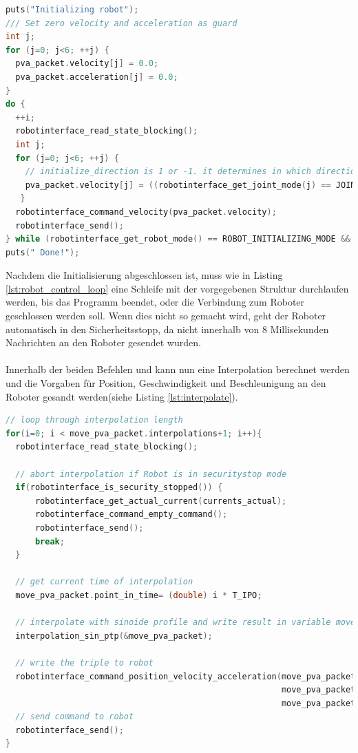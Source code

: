 \begin{lstlisting}[language=C,caption={Initialisierung der einzelnen Gelenke}, label=lst:initialize_robot_lst,captionpos=b]
puts("Initializing robot");
/// Set zero velocity and acceleration as guard
int j;
for (j=0; j<6; ++j) {
  pva_packet.velocity[j] = 0.0;
  pva_packet.acceleration[j] = 0.0;
}
do {
  ++i;
  robotinterface_read_state_blocking();
  int j;
  for (j=0; j<6; ++j) {
    // initialize_direction is 1 or -1. it determines in which direction die Joint is moving during the initialization
    pva_packet.velocity[j] = ((robotinterface_get_joint_mode(j) == JOINT_INITIALISATION_MODE)) ? (initialize_direction)* 0.1 : 0.0;
   }
  robotinterface_command_velocity(pva_packet.velocity);
  robotinterface_send();
} while (robotinterface_get_robot_mode() == ROBOT_INITIALIZING_MODE && exit_flag == false);
puts(" Done!");
\end{lstlisting}

Nachdem die Initialisierung abgeschlossen ist, muss wie in Listing \ref{lst:robot_control_loop} eine Schleife mit der vorgegebenen Struktur durchlaufen werden, bis das Programm beendet, oder die Verbindung zum Roboter geschlossen werden soll. Wenn dies nicht so gemacht wird, geht der Roboter automatisch in den Sicherheitsstopp, da nicht innerhalb von 8 Millisekunden Nachrichten an den Roboter gesendet wurden.
\\\\
Innerhalb der beiden Befehlen  und  kann nun eine Interpolation berechnet werden und die Vorgaben für Position, Geschwindigkeit und Beschleunigung an den Roboter gesandt werden(siehe Listing \ref{lst:interpolate}).

\begin{lstlisting}[language=C,caption={Interpolation eines Berechneten Weges}, label=lst:interpolate,captionpos=b]
// loop through interpolation length  
for(i=0; i < move_pva_packet.interpolations+1; i++){
  robotinterface_read_state_blocking();

  // abort interpolation if Robot is in securitystop mode
  if(robotinterface_is_security_stopped()) {
      robotinterface_get_actual_current(currents_actual);
      robotinterface_command_empty_command();
      robotinterface_send();
      break;
  }

  // get current time of interpolation 
  move_pva_packet.point_in_time= (double) i * T_IPO;

  // interpolate with sinoide profile and write result in variable move_pva_packet
  interpolation_sin_ptp(&move_pva_packet);

  // write the triple to robot
  robotinterface_command_position_velocity_acceleration(move_pva_packet.pva.position,
                                                        move_pva_packet.pva.velocity,
                                                        move_pva_packet.pva.acceleration);
  // send command to robot
  robotinterface_send();
}
\end{lstlisting}

